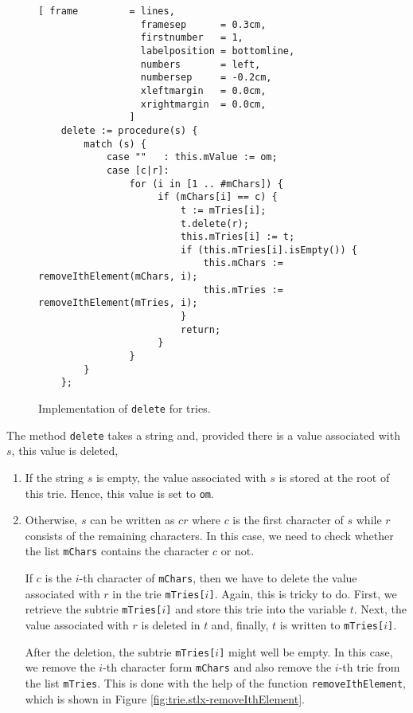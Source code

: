 \begin{figure}[!ht]
\centering
\begin{Verbatim}[ frame         = lines, 
                  framesep      = 0.3cm, 
                  firstnumber   = 1,
                  labelposition = bottomline,
                  numbers       = left,
                  numbersep     = -0.2cm,
                  xleftmargin   = 0.0cm,
                  xrightmargin  = 0.0cm,
                ]
    delete := procedure(s) {
        match (s) {
            case ""   : this.mValue := om;
            case [c|r]: 
                for (i in [1 .. #mChars]) {
                     if (mChars[i] == c) {
                         t := mTries[i]; 
                         t.delete(r);
                         this.mTries[i] := t;
                         if (this.mTries[i].isEmpty()) {
                             this.mChars := removeIthElement(mChars, i);
                             this.mTries := removeIthElement(mTries, i);
                         }
                         return;
                     }
                }
        }
    };
\end{Verbatim}
\vspace*{-0.3cm}
\caption{Implementation of \texttt{delete} for tries.}
\label{fig:trie.stlx-delete}
\end{figure}

The method \texttt{delete} takes a string and, provided there is a value associated with $s$, this
value is deleted,
\begin{enumerate}
\item If the string $s$ is empty, the value associated with $s$ is stored at the root of this trie.
      Hence, this value is set to \texttt{om}.
\item Otherwise, $s$ can be written as $cr$ where $c$ is the first character of $s$ while $r$
      consists of the remaining characters.  In this case, we need to check whether the list
      \texttt{mChars} contains the character $c$ or not.
 
      If $c$ is the $i$-th character of \texttt{mChars}, then we have to delete the value 
      associated with $r$ in the trie \texttt{mTries[$i$]}.  Again, this is tricky to do.
      First, we retrieve the subtrie \texttt{mTries[$i$]} and store this trie into the
      variable $t$.  Next, the value associated with $r$ is deleted in $t$ and, finally, 
      $t$ is written to \texttt{mTries[$i$]}.  

      After the deletion, the subtrie  \texttt{mTries[$i$]} might well be empty.  In this case,
      we remove the $i$-th character form \texttt{mChars} and also remove the $i$-th trie from the list
      \texttt{mTries}.  This is done with the help of the function \texttt{removeIthElement},
      which is shown in Figure \ref{fig:trie.stlx-removeIthElement}.
\end{enumerate}

